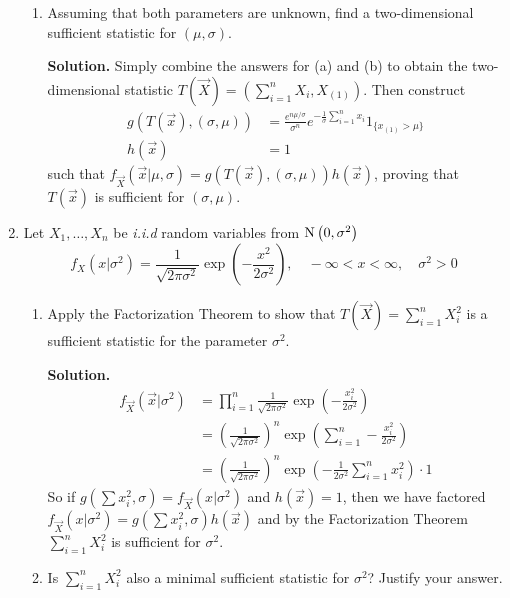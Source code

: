 \documentclass[titlepage]{article}
\begin{document}
\begin{enumerate}
\begin{enumerate}
  \item Assuming that both parameters are unknown, find a two-dimensional sufficient statistic for $(\mu, \sigma)$.

  \textbf{Solution.} Simply combine the answers for (a) and (b) to obtain the two-dimensional statistic $T(\vec{X}) = (\sum_{i=1}^n X_i, X_{(1)})$. Then construct
  \[\begin{aligned}
  g(T(\vec{x}), (\sigma, \mu)) &= \frac{e^{n\mu/\sigma}}{\sigma^n} e^{-\frac{1}{\sigma}\sum_{i=1}^n x_i}1_{\{x_{(1)} > \mu\}} \\
  h(\vec{x}) &= 1
  \end{aligned}\]
  such that $f_\vec{X}(\vec{x}|\mu, \sigma) = g\left(T(\vec{x}), (\sigma, \mu)\right) h(\vec{x})$, proving that $T(\vec{x})$ is sufficient for $(\sigma, \mu)$.
  \end{enumerate}

\item Let $X_1, \ldots, X_n$ be \emph{i.i.d} random variables from $\text{N}\left( 0, \sigma^2 \right)$
\[ f_X(x | \sigma^2) = \frac{1}{\sqrt{2\pi\sigma^2}}\exp\left(-\frac{x^2}{2\sigma^2}\right), \quad -\infty < x < \infty, \quad \sigma^2 > 0
\]
  \begin{enumerate}
  \item Apply the Factorization Theorem to show that $T(\vec{X}) = \sum_{i=1}^n X_i^2$ is a sufficient statistic for the parameter $\sigma^2$.

  \textbf{Solution.}
  \[\begin{aligned}
  f_{\vec{X}}(\vec{x}|\sigma^2) &= \prod_{i=1}^n \frac{1}{\sqrt{2\pi\sigma^2}}\exp\left(-\frac{x_i^2}{2\sigma^2}\right) \\
  &= \left(\frac{1}{\sqrt{2\pi\sigma^2}}\right)^n \exp\left(\sum_{i=1}^n -\frac{x_i^2}{2\sigma^2}\right) \\
  &= \left(\frac{1}{\sqrt{2\pi\sigma^2}}\right)^n \exp\left(-\frac{1}{2\sigma^2} \sum_{i=1}^n x_i^2\right) \cdot 1
  \end{aligned}\]
  So if $g(\sum x_i^2, \sigma) = f_\vec{X}(x | \sigma^2)$ and $h(\vec{x}) = 1$, then we have factored $f_\vec{X}(x | \sigma^2) = g(\sum x_i^2, \sigma)h(\vec{x})$ and by the Factorization Theorem $\sum_{i=1}^n X_i^2$ is sufficient for $\sigma^2$.

  \item Is $\sum_{i=1}^n X_i^2$ also a minimal sufficient statistic for $\sigma^2$? Justify your answer.


\end{enumerate}
\end{enumerate}
\end{document}
